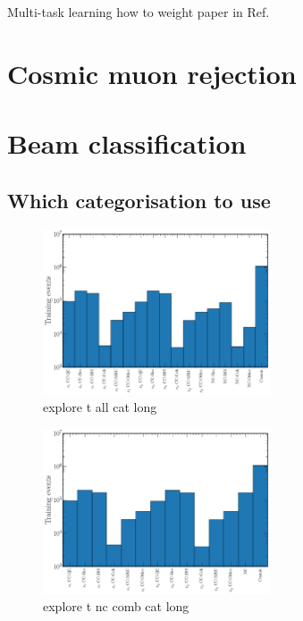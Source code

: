 Multi-task learning how to weight paper in Ref.~\cite{kendall2018}

\section{Cosmic muon rejection} %
\label{sec:cvn_cosmic} %

\section{Beam classification} %
\label{sec:cvn_beam} %

\subsection{Which categorisation to use} %
\label{sec:cvn_beam_cat} %

\begin{figure} %
    \includegraphics[width=0.6\textwidth]{diagrams/7-cvn/chipsnet/explore_t_all_cat.pdf}
    \caption[explore t all cat short]
    {explore t all cat long}
    \label{fig:explore_t_all_cat}
\end{figure}

\begin{figure} %
    \includegraphics[width=0.6\textwidth]{diagrams/7-cvn/chipsnet/explore_t_nc_comb_cat.pdf}
    \caption[explore t nc comb cat short]
    {explore t nc comb cat long}
    \label{fig:explore_t_nc_comb_cat}
\end{figure}

